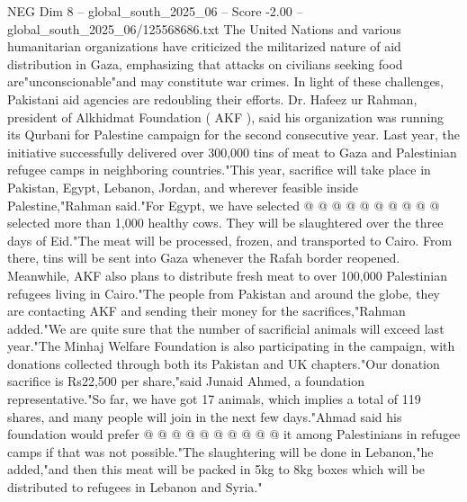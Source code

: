 \begin{textsample}{NEG Dim 8 – global\_south\_2025\_06 – Score -2.00 – global\_south\_2025\_06/125568686.txt}
The United Nations and various humanitarian organizations have criticized the militarized nature of aid distribution in Gaza, emphasizing that attacks on civilians seeking food are"unconscionable"and may constitute war crimes.
In light of these challenges, Pakistani aid agencies are redoubling their efforts.
Dr.
Hafeez ur Rahman, president of Alkhidmat Foundation ( AKF ), said his organization was running its Qurbani for Palestine campaign for the second consecutive year.
Last year, the initiative successfully delivered over 300,000 tins of meat to Gaza and Palestinian refugee camps in neighboring countries."This year, sacrifice will take place in Pakistan, Egypt, Lebanon, Jordan, and wherever feasible inside Palestine,"Rahman said."For Egypt, we have selected @ @ @ @ @ @ @ @ @ @ selected more than 1,000 healthy cows.
They will be slaughtered over the three days of Eid."The meat will be processed, frozen, and transported to Cairo.
From there, tins will be sent into Gaza whenever the Rafah border reopened.
Meanwhile, AKF also plans to distribute fresh meat to over 100,000 Palestinian refugees living in Cairo."The people from Pakistan and around the globe, they are contacting AKF and sending their money for the sacrifices,"Rahman added."We are quite sure that the number of sacrificial animals will exceed last year."The Minhaj Welfare Foundation is also participating in the campaign, with donations collected through both its Pakistan and UK chapters."Our donation sacrifice is Rs22,500 per share,"said Junaid Ahmed, a foundation representative."So far, we have got 17 animals, which implies a total of 119 shares, and many people will join in the next few days."Ahmad said his foundation would prefer @ @ @ @ @ @ @ @ @ @ it among Palestinians in refugee camps if that was not possible."The slaughtering will be done in Lebanon,"he added,"and then this meat will be packed in 5kg to 8kg boxes which will be distributed to refugees in Lebanon and Syria."

\end{textsample}
